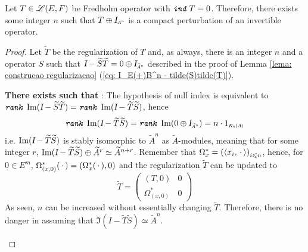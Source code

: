 \begin{proposicao}
    \label{prop:ind(T)=0 --> T(+)Id eh perturbacao compacta de invertivel}
Let $T\in \mathscr L(E,F)$ be Fredholm operator with $\texttt{\textit{ind}}\, T = 0$. Therefore, there exists some integer $n$ such that $T\oplus \sub\Id{A^n}$ is a compact perturbation of an invertible operator.

\begin{proof}
Let $\widetilde{T}$ be the regularization of $T$ and, as always, there is an integer $n$ and a operator $S$ such that $\Id-\widetilde{S}\widetilde{T} = 0 \oplus \sub\Id{\widetilde{A}^n}$ described in the proof of Lemma \ref{lema: construcao regularizacao} (\ref{eq: I_E(+)B^n - tilde(S)tilde(T)}). 

\begin{itroman}
    \item \textbf{There exists  such that }: The hypothesis of null index is equivalent to $\texttt{\textit{rank}}\, \operatorname{Im}(\textsl{I}-\widetilde{S}\widetilde{T}) = \texttt{\textit{rank}}\, \operatorname{Im}(\textsl{I}-\widetilde{T}\widetilde{S})$, hence
    \begin{equation*}
        \rank \Im(\Id-\widetilde{T}\widetilde{S}) = \rank \Im (0\oplus \sub{\Id}{\widetilde{A}^n}) = n \cdot \sub{1}{K_0(A)}
    \end{equation*}
    i.e. $\operatorname{Im}(\textsl{I}-\widetilde{T}\widetilde{S})$ is stably isomorphic to $\widetilde{A}^n$ as $\widetilde{A}$-modules, meaning that for some integer $r$, $\operatorname{Im}(\textsl{I}-\widetilde{T}\widetilde{S}) \oplus \widetilde{A}^r \simeq \widetilde{A}^{n+r}$. Remember that $\Omega_x^* =  \left(\langle {x_i},{\operatorname{\,\cdot\,}}\rangle\right)_{i\leqslant n}$, hence, for $0 \in E^m$, $\Omega_{(x,0)}^*(\operatorname{\,\cdot\,}) = (\Omega_x^*(\operatorname{\,\cdot\,}), 0)$ and the regularization $\widetilde{T}$ can be updated to
    \begin{equation*}
        \widetilde{T} = \begin{pmatrix}
        (T,0) & 0 \\ \Omega_{(x,0)}^* & 0 
        \end{pmatrix}
    \end{equation*}
    As seen, $n$ can be increased without essentially changing $\widetilde{T}$. Therefore, there is no danger in assuming that $\Im(I-\widetilde{T}\widetilde{S}) \simeq \widetilde{A}^n$. 


\end{itroman}
\end{proof}
\end{proposicao}
